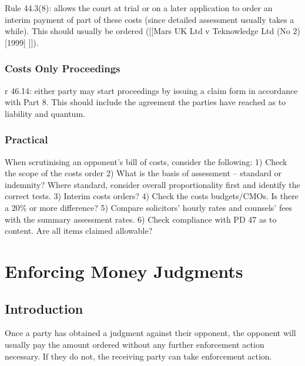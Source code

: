 \documentclass[
]{article}
\newenvironment{Shaded}{}{}
\newcommand{\NormalTok}[1]{#1}
\begin{document}
Rule 44.3(8): allows the court at trial or on a later application to
order an interim payment of part of these costs (since detailed
assessment usually takes a while). This should usually be ordered
({[}{[}Mars UK Ltd v Teknowledge Ltd (No 2) {[}1999{]} {]}{]}).

\hypertarget{costs-only-proceedings}{%
\subsubsection{Costs Only Proceedings}\label{costs-only-proceedings}}

r 46.14: either party may start proceedings by issuing a claim form in
accordance with Part 8. This should include the agreement the parties
have reached as to liability and quantum.

\hypertarget{practical}{%
\subsubsection{Practical}\label{practical}}

\begin{Shaded}
\begin{Highlighting}[]
\NormalTok{When scrutinising an opponent’s bill of costs, consider the following:}
\NormalTok{1) Check the scope of the costs order}
\NormalTok{2) What is the basis of assessment – standard or indemnity? Where standard, consider overall proportionality first and identify the correct tests.}
\NormalTok{3) Interim costs orders?}
\NormalTok{4) Check the costs budgets/CMOs. Is there a 20\% or more difference?}
\NormalTok{5) Compare solicitors’ hourly rates and counsels’ fees with the summary assessment rates.}
\NormalTok{6) Check compliance with PD 47 as to content. Are all items claimed allowable?}
\end{Highlighting}
\end{Shaded}

\hypertarget{enforcing-money-judgments}{%
\section{Enforcing Money Judgments}\label{enforcing-money-judgments}}

\hypertarget{introduction}{%
\subsection{Introduction}\label{introduction}}

Once a party has obtained a judgment against their opponent, the
opponent will usually pay the amount ordered without any further
enforcement action necessary. If they do not, the receiving party can
take enforcement action.
\end{document}
